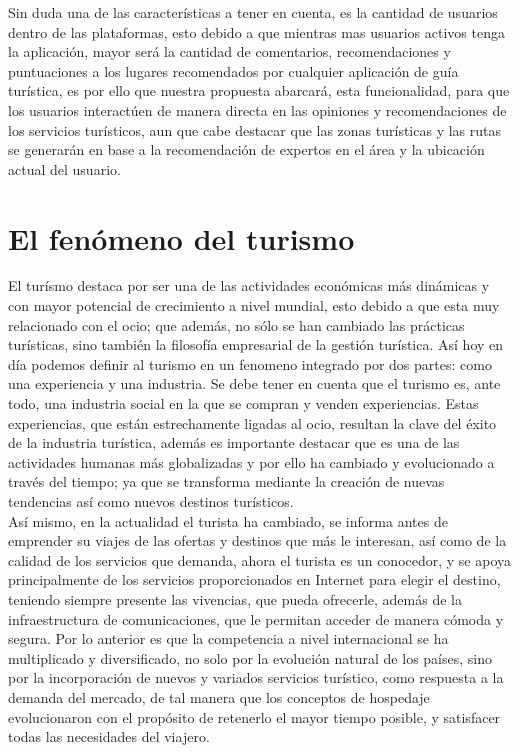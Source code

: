 Sin duda una de las características a tener en cuenta, es la cantidad de usuarios dentro de las plataformas, esto debido a que mientras mas usuarios activos tenga la aplicación, mayor será la cantidad de comentarios, recomendaciones y puntuaciones a los lugares recomendados por cualquier aplicación de guía turística, es por ello que nuestra propuesta abarcará, esta funcionalidad, para que los usuarios interactúen de manera directa en las opiniones y recomendaciones de los servicios turísticos, aun que cabe destacar que las zonas turísticas y las rutas se generarán en base a la recomendación de expertos en el área y la ubicación actual del usuario. \\

\section{El fenómeno del turismo}

El turísmo destaca por ser una de las actividades económicas más dinámicas y con mayor potencial de crecimiento a nivel mundial, esto debido a que esta muy relacionado con el ocio; que además, no sólo se han cambiado las prácticas turísticas, sino también la filosofía empresarial de la gestión turística. Así hoy en día podemos definir al turismo en un fenomeno integrado por dos partes: como una experiencia y una industria. Se debe tener en cuenta que el turismo es, ante todo, una industria social en la que se compran y venden experiencias. Estas experiencias, que están estrechamente ligadas al ocio, resultan la clave del éxito de la industria turística, además es importante destacar que es una de las actividades humanas más globalizadas y por ello ha cambiado y evolucionado a través del tiempo; ya que se transforma mediante la creación de nuevas tendencias así como nuevos destinos turísticos.\cite{fenom}\\

Así mismo, en la actualidad el turista ha cambiado, se informa antes de emprender su viajes de las ofertas y destinos que más le interesan, así como de la calidad de los servicios que demanda, ahora el turista es un conocedor, y se apoya principalmente de los servicios proporcionados en Internet para elegir el destino, teniendo siempre presente las vivencias, que pueda ofrecerle, además de la infraestructura de comunicaciones, que le permitan acceder de manera cómoda y segura. Por lo anterior es que la competencia a nivel internacional se ha multiplicado y diversificado, no solo por la evolución natural de los países, sino por la incorporación de nuevos y variados servicios turístico, como respuesta a la demanda del mercado, de tal manera que los conceptos de hospedaje evolucionaron con el propósito de retenerlo el mayor tiempo posible, y satisfacer todas las necesidades del viajero.\cite{fenom}